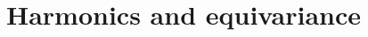 \documentclass{article} %
\newcommand{\1}{\b{1}}              %
\newcommand{\0}{\b{0}}              %
\newcommand{\todo}[1]{{\color[rgb]{.6,.1,.6}{#1}}}
\begin{document}




\section{Harmonics and equivariance}


\end{document}
